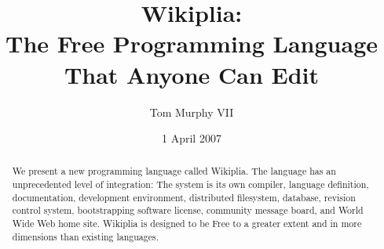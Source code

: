 \documentclass[twocolumn]{article}
\begin{document}
\newcommand\currentrevision{475}
\newcommand\wikipliaurl{http://wikiplia.spacebar.org/}

\newcommand\ftinker{\ensuremath{\copyright}}
\newcommand\fexpression{\ensuremath{\hbar}}
\newcommand\fbeer{\ensuremath{\triangle}}
\newcommand\fusa{\ensuremath{\sqrt[x^{1.2}]{\mbox{\t{oo}} + \frac{x}{z^2}}}}
\newcommand\ffree{\ensuremath{\P}}
\newcommand\ftobe{{\tiny \ensuremath{\stackrel{\bigcirc}{\amalg}}}}

\newcommand\wcite[1]{\footnote{\tiny Wikipedia, the free encyclopedia: {\it #1}; 2007}}
\newcommand\wciteshort[1]{\footnote{\tiny Wikipedia, the free encyclopedia: {\it #1}}}
\newcommand\comment[1]{}
\newcommand\z{\ensuremath{\!}}

\newcommand\D\Delta
\newcommand\G\Gamma
\newcommand\m\mapsto
\newcommand\eval{{\sf eval\,\,}}
\newcommand\tag[2]{{\tt{\mbox{\tt <}}{#1}{\mbox{\tt>}}}{#2}{\tt{\mbox{\tt</}}{#1}{\mbox{\tt>}}}}
\newcommand\prim{{\,\,\sf prim}}
\newcommand\rate{{\sf rate\,\,}}

\newcommand\lb{\ensuremath{[\![}}
\newcommand\rb{\ensuremath{]\!]}}

\title{{\bf \huge Wikiplia}:\\
       The Free Programming Language\\
       That Anyone Can Edit}

\author{Tom Murphy VII}
\date{1 April 2007}

\maketitle

\begin{abstract}
We present a new programming language called Wikiplia. The language
has an unprecedented level of integration: The system is its own
compiler, language definition, documentation, development environment,
distributed filesystem, database, revision control system,
bootstrapping software license, community message board, and World
Wide Web home site. Wikiplia is designed to be Free to a greater
extent and in more dimensions than existing languages.
\end{abstract}

\end{document}
